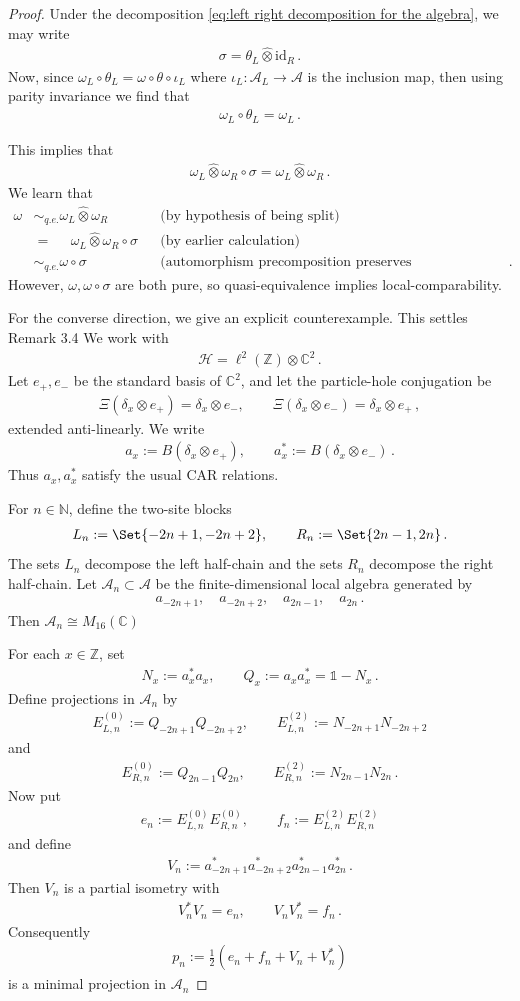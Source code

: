 \documentclass[a4paper,10pt]{article}
\numberwithin{equation}{section}
\theoremstyle{plain}
\theoremstyle{plain}
\theoremstyle{plain}
\theoremstyle{plain}
\theoremstyle{plain}
\theoremstyle{remark}
\theoremstyle{definition}
\newcommand{\ZZ}{\mathbb{Z}}
\newcommand{\NN}{\mathbb{N}}
\newcommand{\CC}{\mathbb{C}}
\newcommand{\calA}{\mathcal{A}}
\newcommand{\calH}{\mathcal{H}}
\newcommand{\Id}{\mathds{1}}
\newcommand{\eq}[1]{\begin{align*}#1\end{align*}}
\newcommand{\eql}[1]{\begin{align}#1\end{align}}
\newcommand{\onehalf}{\frac{1}{2}}
\newcommand{\br}[1]{\left(#1\right)}
\begin{document}
\begin{proof}
    Under the decomposition \cref{eq:left right decomposition for the algebra}, we may write 
    \eq{
    \sigma = \theta_L \hat{\otimes}\mathrm{id}_R\,.
    } Now, since $\omega_L\circ\theta_L = \omega\circ\theta\circ\iota_L$ where $\iota_L:\calA_L\to\calA$ is the inclusion map, then using parity invariance we find that \eq{
    \omega_L \circ \theta_L = \omega_L\,.
    }

    This implies that
    \eq{
    \omega_L\hat{\otimes}\omega_R\circ \sigma = \omega_L\hat{\otimes}\omega_R\,.
    } We learn that
 \eq{
    \omega &\sim_{q.e.} \omega_L\hat{\otimes}\omega_R
      &&\text{(by hypothesis of being split)}\\
    &=\quad\,\, \omega_L\hat{\otimes}\omega_R\circ\sigma&&\text{(by earlier calculation)}\\
    &\sim_{q.e.} \omega\circ\sigma&&\text{(automorphism precomposition preserves quasiequivalence relation)}\,.
} However, $\omega,\omega\circ\sigma$ are both pure, so quasi-equivalence implies local-comparability.

For the converse direction, we give an explicit
counterexample. This settles \cite{Matsui2020SplitFermionicString} Remark 3.4 We work with
\eq{
    \calH=\ell^2(\ZZ)\otimes\CC^2\,.
}
Let $e_+,e_-$ be the standard basis of $\CC^2$, and let the particle-hole
conjugation be
\eq{
    \Xi(\delta_x\otimes e_+)=\delta_x\otimes e_-,
    \qquad
    \Xi(\delta_x\otimes e_-)=\delta_x\otimes e_+\, ,
}
extended anti-linearly. We write
\eq{
    a_x:=B(\delta_x\otimes e_+),
    \qquad
    a_x^*:=B(\delta_x\otimes e_-)\,.
}
Thus $a_x,a_x^*$ satisfy the usual CAR relations.

For $n\in\NN$, define the two-site blocks
\eq{
    L_n:=\Set{-2n+1,-2n+2},
    \qquad
    R_n:=\Set{2n-1,2n}\,.
}
The sets $L_n$ decompose the left half-chain and the sets $R_n$ decompose the
right half-chain. Let $\calA_n\subset\calA$ be the finite-dimensional local
algebra generated by
\eq{
    a_{-2n+1},\quad a_{-2n+2},\quad a_{2n-1},\quad a_{2n}\,.
}
Then $\calA_n\cong M_{16}(\CC)$

For each $x\in\ZZ$, set
\eq{
    N_x:=a_x^*a_x,
    \qquad
    Q_x:=a_xa_x^*=\Id-N_x\,.
}
Define projections in $\calA_n$ by
\eq{
    E^{(0)}_{L,n}:=Q_{-2n+1}Q_{-2n+2},
    \qquad
    E^{(2)}_{L,n}:=N_{-2n+1}N_{-2n+2}
}
and
\eq{
    E^{(0)}_{R,n}:=Q_{2n-1}Q_{2n},
    \qquad
    E^{(2)}_{R,n}:=N_{2n-1}N_{2n}\,.
}
Now put
\eq{
    e_n:=E^{(0)}_{L,n}E^{(0)}_{R,n},
    \qquad
    f_n:=E^{(2)}_{L,n}E^{(2)}_{R,n}
}
and define
\eq{
    V_n:=a_{-2n+1}^*a_{-2n+2}^*a_{2n-1}^*a_{2n}^*\,.
}
Then $V_n$ is a partial isometry with
\eq{
    V_n^*V_n=e_n,
    \qquad
    V_nV_n^*=f_n\,.
}
Consequently
\eql{
    p_n:=\onehalf\br{e_n+f_n+V_n+V_n^*}
}
is a minimal projection in $\calA_n$


\end{proof}
\end{document}
